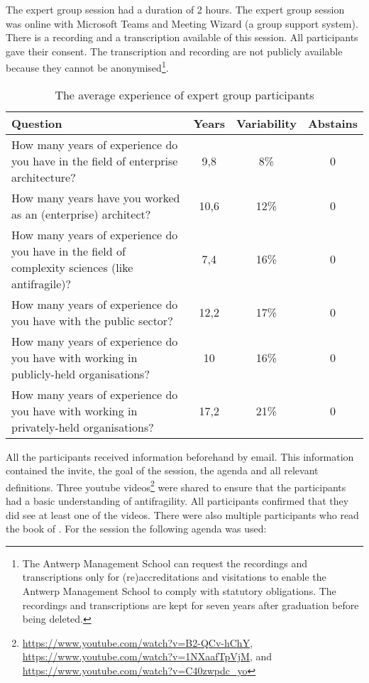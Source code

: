 The expert group session had a duration of 2 hours. The expert group session was online with Microsoft Teams and Meeting Wizard (a group support system). There is a recording and a transcription available of this session. All participants gave their consent. The transcription and recording are not publicly available because they cannot be anonymised\footnote{The Antwerp Management School can request the recordings and transcriptions only for (re)accreditations and visitations to enable the Antwerp Management School to comply with statutory obligations. The recordings and transcriptions are kept for seven years after graduation before being deleted.}.
\begin{table}[H]
	\centering
	\begin{tabular}{p{}ccc}
		\toprule
		\textbf{Question} & \textbf{Years} & \textbf{Variability} & \textbf{Abstains} \\
		\midrule
		How many years of experience do you have in the field of enterprise architecture? & 9,8 & 8\% & 0 \\%
		How many years have you worked as an (enterprise) architect? & 10,6 & 12\% & 0 \\%
		How many years of experience do you have in the field of complexity sciences (like antifragile)? & 7,4 & 16\% & 0 \\%
		How many years of experience do you have with the public sector? & 12,2 & 17\% & 0 \\%
		How many years of experience do you have with working in publicly-held organisations? & 10 & 16\% & 0 \\%
		How many years of experience do you have with working in privately-held organisations? & 17,2 & 21\% & 0 \\%
		\bottomrule
	\end{tabular}%
	\caption[The average experience of expert group participants]{The average experience of expert group participants}
	\label{tab:experiencevalidationgroup}%
\end{table}%
All the participants received information beforehand by email. This information contained the invite, the goal of the session, the agenda and all relevant definitions. Three youtube videos\footnote{\url{https://www.youtube.com/watch?v=B2-QCv-hChY}, \url{https://www.youtube.com/watch?v=1NXaafTpVjM}, and \url{https://www.youtube.com/watch?v=C40zwpdc_yo}} were shared to ensure that the participants had a basic understanding of \gls{antifragility}. All participants confirmed that they did see at least one of the videos. There were also multiple participants who read the book of \textcite{Taleb2012}. For the session the following agenda was used:
